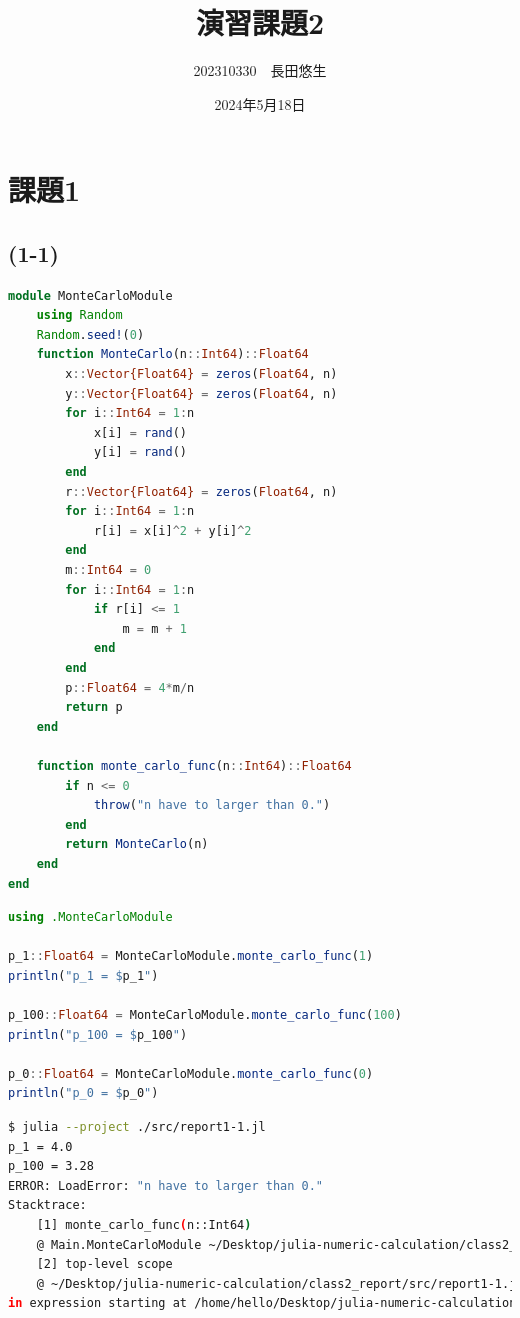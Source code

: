 \documentclass[uplatex, dvipdfmx, a4j,11pt]{jsarticle}
\title{演習課題2}
\author{202310330　長田悠生}
\date{2024年5月18日}
\begin{document}
\section*{課題1}
\subsection*{(1-1)}
\begin{lstlisting}[title={(1-1)のソースコード}, label=code:in, language=Julia]
module MonteCarloModule
    using Random
    Random.seed!(0)
    function MonteCarlo(n::Int64)::Float64
        x::Vector{Float64} = zeros(Float64, n)
        y::Vector{Float64} = zeros(Float64, n)
        for i::Int64 = 1:n
            x[i] = rand()
            y[i] = rand()
        end
        r::Vector{Float64} = zeros(Float64, n)
        for i::Int64 = 1:n
            r[i] = x[i]^2 + y[i]^2
        end
        m::Int64 = 0
        for i::Int64 = 1:n
            if r[i] <= 1
                m = m + 1
            end
        end
        p::Float64 = 4*m/n
        return p
    end

    function monte_carlo_func(n::Int64)::Float64
        if n <= 0
            throw("n have to larger than 0.")
        end
        return MonteCarlo(n)
    end
end

\end{lstlisting}

\newpage
{}

\begin{lstlisting}[title={上記の関数に具体的なnの値を入れてみたときのソースコード}, label=code:in, language=Julia]
using .MonteCarloModule

p_1::Float64 = MonteCarloModule.monte_carlo_func(1)
println("p_1 = $p_1")

p_100::Float64 = MonteCarloModule.monte_carlo_func(100)
println("p_100 = $p_100")

p_0::Float64 = MonteCarloModule.monte_carlo_func(0)
println("p_0 = $p_0")

\end{lstlisting}

\begin{lstlisting}[title={実行結果}, label=code:in, language=sh]
$ julia --project ./src/report1-1.jl
p_1 = 4.0
p_100 = 3.28
ERROR: LoadError: "n have to larger than 0."
Stacktrace:
    [1] monte_carlo_func(n::Int64)
    @ Main.MonteCarloModule ~/Desktop/julia-numeric-calculation/class2_report/src/report1-1.jl:27
    [2] top-level scope
    @ ~/Desktop/julia-numeric-calculation/class2_report/src/report1-1.jl:41
in expression starting at /home/hello/Desktop/julia-numeric-calculation/class2_report/src/report1-1.jl:41

\end{lstlisting}
\end{document}
